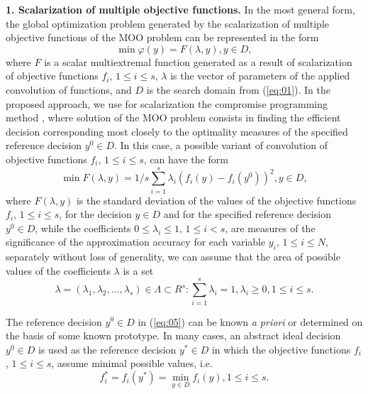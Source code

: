 \documentclass[runningheads]{llncs}
\begin{document}
\textbf{1. Scalarization of multiple objective functions.} In the most general form, the global optimization problem generated by the scalarization of multiple objective functions of the MOO problem can be represented in the form
\begin{equation}
\label{eq:04}
\min {\varphi(y)} = F(\lambda, y), y \in D,
\end{equation}
where $F$ is a scalar multiextremal function generated as a result of scalarization of objective functions $f_i$, $1 \leq i \leq s$, $\lambda$ is the vector of parameters of the applied convolution of functions, and $D$ is the search domain from (\ref{eq:01}). In the proposed approach, we use for scalarization the compromise programming method \cite{c2,c11}, where solution of the MOO problem consists in finding the efficient decision corresponding most closely to the optimality measures of the specified reference decision $y^0 \in D$. In this case, a possible variant of convolution of objective functions $f_i$, $1 \leq i \leq s$, can have the form  
\begin{equation}
\label{eq:05}
\min F(\lambda,y)=1/s \sum_{i=1}^s {\lambda_i (f_i (y)-f_i (y^0 ))^2}, y \in D,
\end{equation}
where $F(\lambda,y)$ is the standard deviation of the values of the objective functions $f_i$, $1 \leq i \leq s$, for the decision $y \in D$ and for the specified reference decision $y^0 \in D$, while the coefficients $0 \leq \lambda_i \leq 1$, $1 \leq i < s$, are measures of the significance of the approximation accuracy for each variable $y_i$, $1 \leq i \leq N$, separately  without loss of generality, we can assume that the area of possible values of the coefficients $\lambda$ is a set 
\begin{equation}
\label{eq:06}
\lambda=(\lambda_1,\lambda_2, \dots, \lambda_s)\in \Lambda \subset R^s: \sum_{i=1}^{s}\lambda_i=1, \lambda_i \geq 0, 1 \leq i \leq s.
\end{equation}

The reference decision $y^0 \in D$ in (\ref{eq:05}) can be known \textit{a priori} or determined on the basis of some known prototype. In many cases, an abstract ideal decision $y^0 \in D$ is used as the reference decision $y^*\in D$ in which the objective functions $f_i$, $1 \leq i \leq s$, assume minimal possible values, i.e.
\begin{equation}
\label{eq:07}
f_i^* =f_i (y^*)=\min_{y \in D} f_i (y), 1 \leq i \leq s.
\end{equation}
\end{document}
